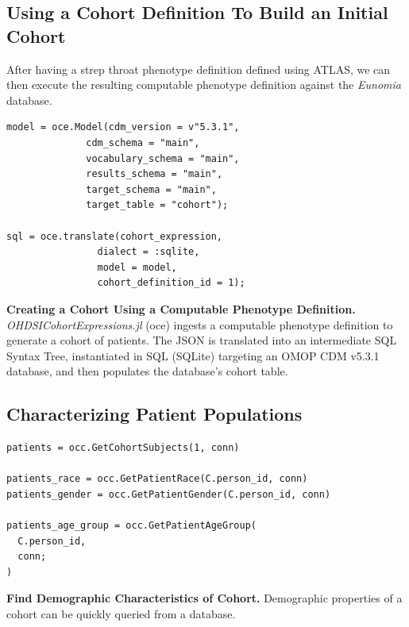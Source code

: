 \documentclass{juliacon}
\begin{document}
\subsection{Using a Cohort Definition To Build an Initial Cohort}

After having a strep throat phenotype definition defined using ATLAS, we can then execute the resulting computable phenotype definition against the \textit{Eunomia} database.

\begin{listing}[!ht]
\begin{verbatim}
model = oce.Model(cdm_version = v"5.3.1", 
              cdm_schema = "main",
              vocabulary_schema = "main", 
              results_schema = "main",
              target_schema = "main", 
              target_table = "cohort");

sql = oce.translate(cohort_expression, 
                dialect = :sqlite, 
                model = model, 
                cohort_definition_id = 1);
\end{verbatim}
\caption{\textbf{Creating a Cohort Using a Computable Phenotype Definition.} \textit{OHDSICohortExpressions.jl} (oce) ingests a computable phenotype definition to generate a cohort of patients. The JSON is translated into an intermediate SQL Syntax Tree, instantiated in SQL (SQLite) targeting an OMOP CDM v5.3.1 database, and then populates the database's cohort table.}
\label{listing:cohort_creation}
\end{listing}

\subsection{Characterizing Patient Populations}


\begin{listing}[!ht]
\begin{verbatim}
patients = occ.GetCohortSubjects(1, conn)

patients_race = occ.GetPatientRace(C.person_id, conn)
patients_gender = occ.GetPatientGender(C.person_id, conn)

patients_age_group = occ.GetPatientAgeGroup(
  C.person_id, 
  conn; 
)
\end{verbatim}
\caption{\textbf{Find Demographic Characteristics of Cohort.} Demographic properties of a cohort can be quickly queried from a database.}
\label{listing:demographics}
\end{listing}
\end{document}
